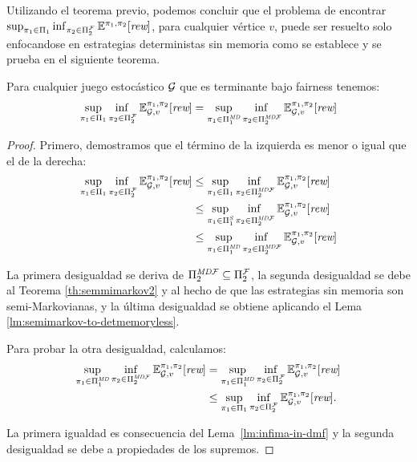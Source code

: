 Utilizando el teorema previo, podemos concluir que el problema de encontrar $\sup_{\pi_{1} \in \Pi_{1}} \inf_{\pi_{2} \in \Pi^{\mathcal{F}}_{2}} \mathbb{E}^{\pi_{1}, \pi_{2}}[\textit{rew}]$, para cualquier vértice $v$, puede ser resuelto solo enfocandose en estrategias deterministas sin memoria como se establece y se prueba en el siguiente teorema.
%
\begin{theorem}\label{th:reduce-to-memoryless}
  Para cualquier juego estocástico $\mathcal{G}$  que es terminante bajo fairness tenemos:
  \[
  \adjustlimits \sup_{\strat{1} \in \Strategies{1}} \inf_{\strat{2} \in \FairStrats{2}} \Expect{\strat{1}}{\strat{2}}_{\StochG,v}[\Rewards]
  =
  \adjustlimits \sup_{\strat{1} \in \DetMemorylessStrats{1}} \inf_{\strat{2} \in \DetMemorylessFairStrats{2}} \Expect{\strat{1}}{\strat{2}}_{\StochG,v}[\Rewards]
 \]
\end{theorem}
%
\begin{proof}
	Primero, demostramos que el término de la izquierda es menor o igual que el de la derecha:
\begin{align*}
  \adjustlimits \sup_{\strat{1} \in \Strategies{1}} \inf_{\strat{2} \in \FairStrats{2}} \Expect{\strat{1}}{\strat{2}}_{\StochG,v}[\Rewards]
  &{} \leq  \adjustlimits \sup_{\strat{1} \in \Strategies{1}} \inf_{\strat{2} \in \DetMemorylessFairStrats{2}} \Expect{\strat{1}}{\strat{2}}_{\StochG,v}[\Rewards]\\
  &{} \leq \adjustlimits  \sup_{\strat{1} \in \SemiMarkovStrats{1}} \inf_{\strat{2} \in \DetMemorylessFairStrats{2}} \Expect{\strat{1}}{\strat{2}}_{\StochG,v}[\Rewards]\\
  &{} \leq \adjustlimits \sup_{\strat{1} \in \DetMemorylessStrats{1}} \inf_{\strat{2} \in \DetMemorylessFairStrats{2}} \Expect{\strat{1}}{\strat{2}}_{\StochG,v}[\Rewards]
\end{align*}

La primera desigualdad se deriva de $\Pi^{\textit{MD}\mathcal{F}}_{2} \subseteq \Pi^{\mathcal{F}}_{2}$, la segunda desigualdad se debe al Teorema \ref{th:semmimarkov2} y al hecho de que las estrategias sin memoria son semi-Markovianas, y la última desigualdad se obtiene aplicando el Lema \ref{lm:semimarkov-to-detmemoryless}.

Para probar la otra desigualdad, calculamos:
%
 \begin{align*}
  \sup_{\pi_{1} \in \Pi^{\textit{MD}}_{1}} \inf_{\pi_{2} \in \Pi^{\textit{MD}\mathcal{F}}_{2}} \mathbb{E}^{\pi_{1}, \pi_{2}}_{\mathcal{G},v}[\textit{rew}]
 & {} = \sup_{\pi_{1} \in \Pi^{\textit{MD}}_{1}} \inf_{\pi_{2} \in \Pi^{\mathcal{F}}_{2}} \mathbb{E}^{\pi_{1}, \pi_{2}}_{\mathcal{G},v}[\textit{rew}] \\
 & {} \leq \sup_{\pi_{1} \in \Pi_{1}} \inf_{\pi_{2} \in \Pi^{\mathcal{F}}_{2}} \mathbb{E}^{\pi_{1}, \pi_{2}}_{\mathcal{G},v}[\textit{rew}].
 \end{align*}

%
  La primera igualdad es consecuencia del Lema~\ref{lm:infima-in-dmf} y la segunda desigualdad se debe a propiedades de los supremos.
\qedhere
\end{proof}





